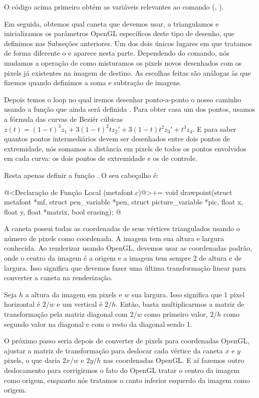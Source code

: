 {{{{{{O código acima primeiro obtém as variáveis relevantes ao comando
(, ).

Em seguida, obtemos qual caneta que devemos usar, a
triangulamos e inicializamos os parâmetros OpenGL específicos deste
tipo de desenho, que definimos nas Subseções anteriores. Um dos dois
únicos lugares em que tratamos de forma diferente o 
e  aparece nesta parte. Dependendo do comando, nós
mudamos a operação de como misturamos os pixels novos desenhados com
os pixels já existentes na imagem de destino. As escolhas feitas são
análogas às que fizemos quando definimos a soma e subtração de
imagens.

Depois temos o loop no qual iremos desenhar ponto-a-ponto o nosso
caminho usando a função que ainda será
definida . Para obter casa um dos pontos, usamos
a fórmula das curvas de Beziér cúbicas $z(t) = (1-t)^3z_1 +
3(1-t)^2tz_2' + 3(1-t)t^2z_3'+t^3z_4$. E para saber quantos pontos
intermediários devem ser desenhados entre dois pontos de extremidade,
nós somamos a distância em pixels de todos os pontos envolvidos em
cada curva: os dois pontos de extremidade e os de controle.

Resta apenas definir a função . O seu cabeçalho
é:

\iniciocodigo
@<Declaração de Função Local (metafont.c)@>+=
void drawpoint(struct metafont *mf, struct pen_variable *pen,
               struct picture_variable *pic, float x, float y, float *matrix,
               bool erasing);
@
\fimcodigo

A caneta possui todas as coordenadas de seus vértices triangulados
usando o número de pixels como coordenada. A imagem tem sua altura e
largura conhecida. Ao renderizar usando OpenGL, devemos usar as
coordenadas padrão, onde o centro da imagem é a origem e a imagem tem
sempre 2 de altura e de largura. Isso significa que devemos fazer uma
última transformação linear para converter a caneta na renderização.

Seja $h$ a altura da imagem em pixels e $w$ sua largura. Isso
significa que 1 pixel horizontal é $2/w$ e um vertical é $2/h$. Então,
basta multiplicarmos a matriz de transformação pela matriz diagonal
com $2/w$ como primeiro valor, $2/h$ como segundo valor na diagonal e
com o resto da diagonal sendo 1.

O próximo passo seria depois de converter de pixels para coordenadas
OpenGL, ajustar a matriz de transformação para deslocar cada vértice
da caneta $x$ e $y$ pixels, o que daria $2x/w$ e $2y/h$ nas
coordenadas OpenGL. E aí fazemos outro deslocamento para corrigirmos o
fato do OpenGL tratar o centro da imagem como origem, enquanto nós
tratamos o canto inferior esquerdo da imagem como origem.

}}}}}}

